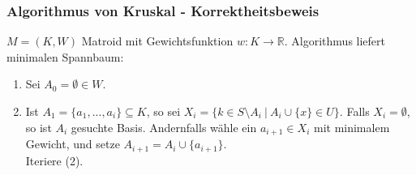 \begin{frame}
    \frametitle{Algorithmus von Kruskal - Korrektheitsbeweis}
    \begin{theorem}
    		$M = (K, W)$ Matroid mit Gewichtsfunktion $w: K \rightarrow \mathbb{R}$. Algorithmus liefert minimalen Spannbaum:
    		\begin{enumerate}
    			\item Sei $A_{0} = \emptyset \in W$.
    			\item Ist $A_{1} = \{ a_{1},...,a_{i}\} \subseteq K$, so sei $X_{i} = \{ k \in S\setminus A_{i} \ | \ A_{i} \cup \{ x\} \in U \}$. Falls $X_{i} = \emptyset$, so ist $A_{i}$ gesuchte Basis. Andernfalls wähle ein $a_{i+1} \in X_{i}$ mit minimalem Gewicht, und setze $A_{i + 1} = A_{i} \cup \{ a_{i+1}\}$. \\ Iteriere (2).
    		\end{enumerate}
    \end{theorem}
\end{frame}

